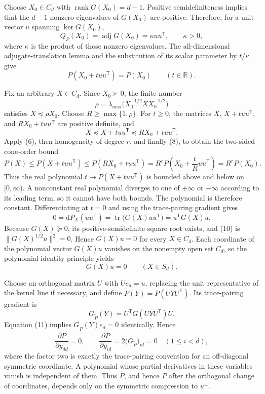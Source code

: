 Choose \(X_0\in C_d\) with \(\operatorname{rank}G(X_0)=d-1\).  Positive semidefiniteness implies that the \(d-1\) nonzero eigenvalues of \(G(X_0)\) are positive.  Therefore, for a unit vector \(u\) spanning \(\ker G(X_0)\),
\[
 Q_P(X_0)=\operatorname{adj}G(X_0)=\kappa uu^{\mathsf T},
 \qquad \kappa>0, \tag{7}
\]
where \(\kappa\) is the product of those nonzero eigenvalues.  The all-dimensional adjugate-translation lemma and the substitution of its scalar parameter by \(t/\kappa\) give
\[
 P(X_0+tuu^{\mathsf T})=P(X_0)
 \qquad(t\in\mathbb R). \tag{8}
\]

Fix an arbitrary \(X\in C_d\).  Since \(X_0\succ0\), the finite number
\[
 \rho=\lambda_{\max}\bigl(X_0^{-1/2}XX_0^{-1/2}\bigr)
\]
satisfies \(X\preceq\rho X_0\).  Choose \(R\geq\max\{1,\rho\}\).  For \(t\geq0\), the matrices \(X\), \(X+tuu^{\mathsf T}\), and \(RX_0+tuu^{\mathsf T}\) are positive definite, and
\[
 X\preceq X+tuu^{\mathsf T}\preceq RX_0+tuu^{\mathsf T}.
\]
Apply (6), then homogeneity of degree \(r\), and finally (8), to obtain the two-sided cone-order bound
\[
 P(X)
 \leq P(X+tuu^{\mathsf T})
 \leq P(RX_0+tuu^{\mathsf T})
 =R^rP\left(X_0+\frac{t}{R}uu^{\mathsf T}\right)
 =R^rP(X_0). \tag{9}
\]
Thus the real polynomial \(t\mapsto P(X+tuu^{\mathsf T})\) is bounded above and below on \([0,\infty)\).  A nonconstant real polynomial diverges to one of \(+\infty\) or \(-\infty\) according to its leading term, so it cannot have both bounds.  The polynomial is therefore constant.  Differentiating at \(t=0\) and using the trace-pairing gradient gives
\[
 0=\mathrm dP_X(uu^{\mathsf T})
 =\operatorname{tr}\bigl(G(X)uu^{\mathsf T}\bigr)
 =u^{\mathsf T}G(X)u. \tag{10}
\]
Because \(G(X)\succeq0\), its positive-semidefinite square root exists, and (10) is \(\lVert G(X)^{1/2}u\rVert^2=0\).  Hence \(G(X)u=0\) for every \(X\in C_d\).  Each coordinate of the polynomial vector \(G(X)u\) vanishes on the nonempty open set \(C_d\), so the polynomial identity principle yields
\[
 G(X)u=0\qquad(X\in S_d). \tag{11}
\]

Choose an orthogonal matrix \(U\) with \(Ue_d=u\), replacing the unit representative of the kernel line if necessary, and define \(\widetilde P(Y)=P(UYU^{\mathsf T})\).  Its trace-pairing gradient is
\[
 G_{\widetilde P}(Y)=U^{\mathsf T}G(UYU^{\mathsf T})U.
\]
Equation (11) implies \(G_{\widetilde P}(Y)e_d=0\) identically.  Hence
\[
 \frac{\partial\widetilde P}{\partial y_{dd}}=0,
 \qquad
 \frac{\partial\widetilde P}{\partial y_{id}}=2\bigl(G_{\widetilde P}\bigr)_{id}=0
 \quad(1\leq i<d), \tag{12}
\]
where the factor two is exactly the trace-pairing convention for an off-diagonal symmetric coordinate.  A polynomial whose partial derivatives in these variables vanish is independent of them.  Thus \(\widetilde P\), and hence \(P\) after the orthogonal change of coordinates, depends only on the symmetric compression to \(u^\perp\).

